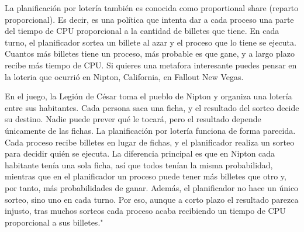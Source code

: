 La planificación por lotería también es conocida como proportional share 
(reparto proporcional). Es decir, es una política que intenta dar a cada proceso una parte del tiempo de CPU proporcional a la cantidad de billetes que tiene. En cada turno, el planificador sortea un billete al azar y el proceso que lo tiene se ejecuta. Cuantos más billetes 
tiene un proceso, más probable es que gane, y a largo plazo recibe más tiempo de CPU. 
Si quieres una metafora interesante puedes pensar en la loteria que ocurrió en Nipton, California,
en Fallout New Vegas.

En el juego, la Legión de César toma el pueblo de Nipton y organiza una lotería entre sus habitantes. Cada persona saca una ficha, y el resultado del sorteo decide su destino. Nadie puede prever qué le tocará, pero el resultado depende únicamente de las fichas. La planificación por lotería funciona de forma parecida. Cada proceso recibe billetes en lugar de fichas, y el planificador realiza un sorteo para decidir quién se ejecuta. La diferencia principal es que en Nipton cada habitante tenía una sola ficha, así que todos tenían la misma probabilidad, mientras que en el planificador un proceso puede tener más billetes que otro y, por tanto, más probabilidades de ganar. Además, el planificador no hace un único sorteo, sino uno en cada turno. Por eso, aunque a corto plazo el resultado parezca injusto, tras muchos sorteos cada proceso acaba recibiendo un tiempo de CPU proporcional a sus billetes."